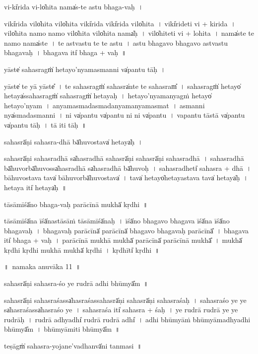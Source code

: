 \documentclass[parskip, DIV=14]{scrartcl}
\begin{document}
{vi-ki̍rida॒ vi-lo̍hita॒ nama̍s-te astu bhaga-vaḥ~।

viki̍rida॒ vilo̍hita॒ vilo̍hita॒ viki̍rida॒ viki̍rida॒ vilo̍hita~।
viki̍ri॒deti॒ vi + ki॒ri॒da॒~। 
vilo̍hita॒ namo॒ namo॒ vilo̍hita॒ vilo̍hita॒ nama̍ḥ~।
vilo̍hi॒teti॒ vi + lo॒hi॒ta॒~।
nama̍ste te॒ namo॒ nama̍ste~।
te॒ a॒stva॒stu॒ te॒ te॒ a॒stu॒~।
a॒stu॒ bha॒ga॒vo॒ bha॒ga॒vo॒ a॒stva॒stu॒ bha॒ga॒va॒ḥ॒~।
bha॒ga॒va॒ iti̍ bhaga + va॒ḥ॒~॥ 

yāste̍ sa॒hasragṁ̍ he॒tayo॒'nyama॒smanni va̍pantu॒ tāḥ~।

yāste̍ te॒ yā yāste̎~।
te॒ sa॒hasragṁ̍ sa॒hasra̍nte te sa॒hasram̎~।
sa॒hasragṁ̍ he॒tayo̍ he॒taya̍ssa॒hasragṁ̍ sa॒hasragṁ̍ he॒tayaḥ~।
he॒tayo॒'nyama॒nyagṁ he॒tayo̍ he॒tayo॒'nyam~।
a॒nyama॒smada॒smada॒nyama॒nyama॒smat~।
a॒smanni nya̍smada॒smanni~।
ni va̍pantu va̍pantu॒ ni ni va̍pantu~।
va॒pa॒ntu॒ tāstā va̍pantu va̍pantu॒ tāḥ~।
tā iti॒ tāḥ~॥ 

sa॒hasrā̍ṇi sahasra॒-dhā bā̍hu॒vostava̍ he॒taya̍ḥ~।

sa॒hasrā̍ṇi sahasra॒dhā sa̍hasra॒dhā sa॒hasrā̍ṇi sa॒hasrā̍ṇi sahasra॒dhā~।
sa॒ha॒sra॒dhā bā̍hu॒vorbā̍hu॒vossa̍hasra॒dhā sa̍hasra॒dhā bā̍hu॒voḥ~।
sa॒ha॒sra॒dheti̍ sahasra + dhā~।
bā॒hu॒vostava॒ tava̍ bāhu॒vorbā̍hu॒vostava̍~।
tava̍ he॒tayo̍he॒taya॒stava॒  tava̍ he॒taya̍ḥ~।
he॒taya॒ iti̍ he॒taya̍ḥ~॥ 

tāsā॒mīśā̍no bhaga-vaḥ parā॒cīnā॒ mukhā̍ kṛdhi~॥ 

tāsā॒mīśā̍na॒ īśā̍na॒stāsā॒ṁ tāsā॒mīśā̍naḥ~।
īśā̍no bhagavo bhagava॒ īśā̍na॒ īśā̍no bhagavaḥ~।
bha॒ga॒va॒ḥ pa॒rā॒cīnā̍ parā॒cīnā̍ bhagavo bhagavaḥ parā॒cīnā̎~।
bha॒ga॒va॒ iti̍ bhaga + va॒ḥ॒~।
pa॒rā॒cīnā॒ mukhā॒ mukhā̍ parā॒cīnā̍ parā॒cīnā॒ mukhā̎~।
mukhā̍ kṛdhi kṛdhi॒ mukhā॒ mukhā̍ kṛdhi~।
kṛ॒dhīti̍ kṛdhi~॥ 

\newpage
\LARGE
॥~namaka anuvāka 11~॥ 
\Large

sa॒hasrā̍ṇi sahasra॒-śo ye ru॒drā adhi॒ bhūmyā̎m~॥

sa॒hasrā̍ṇi sahasra॒śassa̍hasra॒śassa॒hasrā̍ṇi sa॒hasrā̍ṇi sahasra॒śaḥ~।
sa॒ha॒sra॒śo ye ye sa̍hasra॒śassa̍hasra॒śo ye~।
sa॒ha॒sra॒śa iti̍ sahasra + śaḥ~।
ye ru॒drā ru॒drā ye ye ru॒drāḥ~।
ru॒drā adhyadhi̍ ru॒drā ru॒drā adhi̍~।
adhi॒ bhūmyā॒ṁ bhūmyā॒madhyadhi॒ bhūmyā̎m~।
bhūmyā॒miti॒ bhūmyā̎m~॥ 

teṣāgṁ̍ sahasra-yoja॒ne'va॒dhanvā̍ni tanmasi~॥

}
\end{document}
